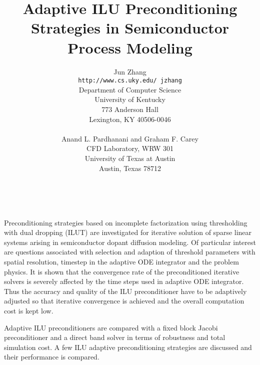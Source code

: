 \documentclass[11pt]{article}
\date{ ~ \hspace{-4mm}}
\title{Adaptive ILU Preconditioning Strategies in Semiconductor Process Modeling  }
\author{Jun Zhang \\ {\tt http://www.cs.uky.edu/~jzhang} \\ Department of Computer Science  \\  University of Kentucky  \\  773 Anderson Hall  \\  Lexington, KY 40506-0046 \\ \\ Anand L. Pardhanani and Graham F. Carey  \\  CFD Laboratory, WRW 301  \\  University of Texas at Austin  \\  Austin, Texas 78712  \\}
\begin{document}
\maketitle
\thispagestyle{empty}





 


Preconditioning strategies based on incomplete factorization
using thresholding with dual dropping (ILUT) are
investigated for iterative solution of sparse linear systems
arising in semiconductor dopant diffusion modeling. Of
particular interest are questions associated with selection and
adaption of threshold parameters with spatial resolution, timestep 
in the adaptive ODE integrator and the problem physics. It is shown
that the convergence rate of the preconditioned iterative solvers
is severely affected by the time steps used in adaptive ODE 
integrator. Thus the accuracy and quality of the ILU preconditioner
have to be adaptively adjusted so that iterative convergence is achieved
and the overall computation cost is kept low.



Adaptive ILU preconditioners are compared with a fixed block Jacobi 
preconditioner and a direct band solver in terms of robustness and
total simulation cost. A few ILU adaptive preconditioning strategies 
are discussed and their performance is compared.
\end{document}
